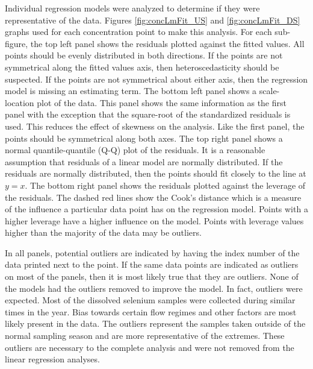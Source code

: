 \begin{linenumbers}
Individual regression models were analyzed to determine if they were representative of the data.  Figures \ref{fig:concLmFit_US} and \ref{fig:concLmFit_DS} graphs used for each concentration point to make this analysis.  For each sub-figure, the top left panel shows the residuals plotted against the fitted values.  All points should be evenly distributed in both directions.  If the points are not symmetrical along the fitted values axis, then heteroscedasticity should be suspected.  If the points are not symmetrical about either axis, then the regression model is missing an estimating term.  The bottom left panel shows a scale-location plot of the data.  This panel shows the same information as the first panel with the exception that the square-root of the standardized residuals is used.  This reduces the effect of skewness on the analysis.  Like the first panel, the points should be symmetrical along both axes.  The top right panel shows a normal quantile-quantile (Q-Q) plot of the residuals.  It is a reasonable assumption that residuals of a linear model are normally distributed.  If the residuals are normally distributed, then the points should fit closely to the line at $y=x$.  The bottom right panel shows the residuals plotted against the leverage of the residuals.  The dashed red lines show the Cook's distance which is a measure of the influence a particular data point has on the regression model.  Points with a higher leverage have a higher influence on the model.  Points with leverage values higher than the majority of the data may be outliers.

In all panels, potential outliers are indicated by having the index number of the data printed next to the point.  If the same data points are indicated as outliers on most of the panels, then it is most likely true that they are outliers.  None of the models had the outliers removed to improve the model.  In fact, outliers were expected.  Most of the dissolved selenium samples were collected during similar times in the year.  Bias towards certain flow regimes and other factors are most likely present in the data.  The outliers represent the samples taken outside of the normal sampling season and are more representative of the extremes.  These outliers are necessary to the complete analysis and were not removed from the linear regression analyses.


\end{linenumbers}
